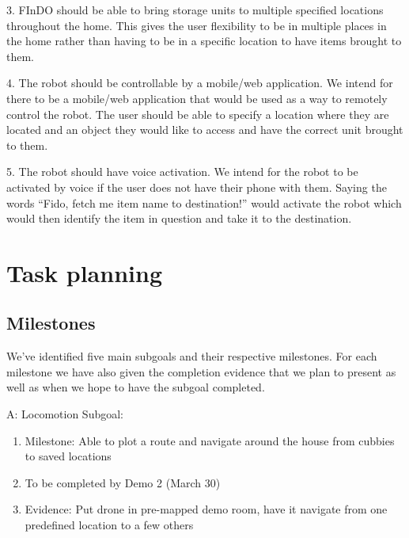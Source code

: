 \documentclass{article}
\begin{document}
3. FInDO should be able to bring storage units to multiple specified locations throughout the home. This gives the user flexibility to be in multiple places in the home rather than having to be in a specific location to have items brought to them. 

4. The robot should be controllable by a mobile/web application. We intend for there to be a mobile/web application that would be used as a way to remotely control the robot. The user should be able to specify a location where they are located and an object they would like to access and have the correct unit brought to them.

5. The robot should have voice activation. We intend for the robot to be activated by voice if the user does not have their phone with them. Saying the words “Fido, fetch me item name to destination!” would activate the robot which would then identify the item in question and take it to the destination.

\section{Task planning}

\subsection{Milestones} 

We’ve identified five main subgoals and their respective milestones. For each milestone we have also given the completion evidence that we plan to present as well as when we hope to have the subgoal completed.

A: Locomotion Subgoal:
\begin{enumerate}
\item Milestone: Able to plot a route and navigate around the house from cubbies to saved locations
\item To be completed by Demo 2 (March 30)
\item Evidence: Put drone in pre-mapped demo room, have it navigate from one predefined location to a few others
\end{enumerate}
\end{document}
